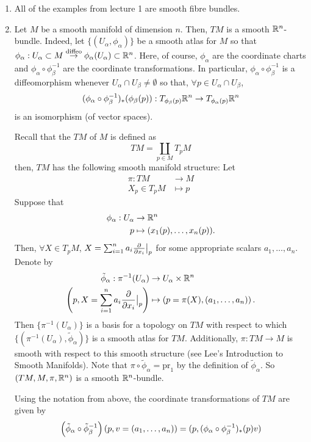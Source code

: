 \documentclass[main.tex]{subfiles}
\begin{document}
\begin{exmp}
\begin{enumerate}
    \item All of the examples from lecture 1 are smooth fibre bundles.
    \item {} Let $M$ be a smooth manifold of dimension $n$. Then, $TM$ is a smooth $\mathbb{R}^n$-bundle. Indeed, let $\{(U_\alpha, \phi_\alpha) \}$ be a smooth atlas for $M$ so that $\phi_\alpha: U_\alpha \subset M \overset{\text{diffeo}}{\to} \phi_\alpha(U_\alpha) \subset \mathbb{R}^n$. Here, of course, $\phi_\alpha$ are the coordinate charts and $\phi_\alpha \circ \phi_\beta^{-1}$ are the coordinate transformations. In particular, $\phi_\alpha \circ \phi_\beta^{-1}$ is a diffeomorphism whenever $U_\alpha \cap U_\beta \neq \emptyset$ so that, $\forall p \in U_\alpha \cap U_\beta$,
    \begin{align*}
        (\phi_\alpha \circ \phi_\beta^{-1})_*(\phi_\beta(p)): T_{\phi_\beta(p)}\mathbb{R}^n \to T_{\phi_\alpha(p)}\mathbb{R}^n
    \end{align*}is an isomorphism (of vector spaces).

    Recall that the  $TM$ of $M$ is defined as
    \[
    TM = \coprod_{p \in M} T_pM
    \]
    then, $TM$ has the following smooth manifold structure: Let
    \begin{align*}
        \pi: TM &\to M \\
            X_p \in T_pM &\mapsto p
    \end{align*}
    Suppose that
    \begin{align*}
        \phi_\alpha: U_\alpha &\to \mathbb{R}^n \\
                        p &\mapsto (x_1(p), \dots, x_n(p)).
    \end{align*}
    Then, $\forall X \in T_pM$, $X = \sum_{i=1}^n a_i \frac{\partial}{\partial x_i}\big|_{p}$ for some appropriate scalars $a_1, \dots, a_n$.
    Denote by
    \begin{align*}
        \tilde{\phi}_\alpha: \pi^{-1}(U_\alpha) &\to U_\alpha \times \mathbb{R}^n \\
                            \left( p, X = \sum_{i=1}^n a_i \frac{\partial}{\partial x_i}\big|_{p} \right) &\mapsto \left( p = \pi(X), (a_1, \dots, a_n) \right).
    \end{align*}
    Then $\{ \pi^{-1}(U_\alpha)\}$ is a basis for a topology on $TM$ with respect to which $\{(\pi^{-1}(U_\alpha), \tilde{\phi}_\alpha) \}$ is a smooth atlas for $TM$. Additionally, $\pi: TM \to M$ is smooth with respect to this smooth structure (see Lee's Introduction to Smooth Manifolds). Note that $\pi \circ \tilde{\phi}_\alpha = \text{pr}_1$ by the definition of $\tilde{\phi}_\alpha$. So $(TM, M, \pi, \mathbb{R}^n)$ is a smooth $\mathbb{R}^n$-bundle.

    \begin{note}
    Using the notation from above, the coordinate transformations of $TM$ are given by
    \[
    \left( \tilde{\phi}_\alpha \circ \tilde{\phi}_\beta^{-1} \right)(p, v = (a_1, \dots, a_n)) = (p, (\phi_\alpha \circ \phi_\beta^{-1})_*(p)v)
    \]
    \end{note}
\end{enumerate}
\end{exmp}
\end{document}
